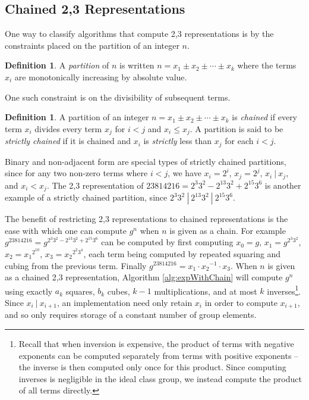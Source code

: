 \documentclass{ucalgthes1}
\theoremstyle{definition}
\newtheorem{defn}[thm]{Definition}
\begin{document}
\subsection{Chained 2,3 Representations}
\label{subsec:dbnsChains}


One way to classify algorithms that compute 2,3 representations is by the constraints placed on the partition of an integer $n$.

\begin{defn}
A \emph{partition} of $n$ is written $n = x_1 \pm x_2 \pm \cdots \pm x_k$ where the terms $x_i$ are monotonically increasing by absolute value.
\end{defn}

\noindent
One such constraint is on the divisibility of subsequent terms.

\begin{defn}
\label{defn:chained}
A partition of an integer $n = x_1 \pm x_2 \pm \cdots \pm x_k$ is \emph{chained} if every term $x_i$ divides every term $x_j$ for $i < j$ and $x_i \le x_j$. A partition is said to be \emph{strictly chained} if it is chained and $x_i$ is \emph{strictly} less than $x_j$ for each $i < j$.
\end{defn}

\noindent
Binary and non-adjacent form are special types of strictly chained partitions, since for any two non-zero terms where $i < j$, we have $x_i = 2^i$, $x_j = 2^j$, $ x_i ~|~ x_j$, and $x_i < x_j$.  The 2,3 representation of $23814216 = 2^3 3^2 - 2^{13} 3^2 + 2^{15} 3^6$ is another example of a strictly chained partition, since $2^3 3^2 ~|~ 2^{13} 3^2 ~|~ 2^{15} 3^6$.

The benefit of restricting 2,3 representations to chained representations is the ease with which one can compute $g^n$ when $n$ is given as a chain.  For example $g^{23814216} = g^{2^3 3^2 - 2^{13} 3^2 + 2^{15} 3^6}$ can be computed by first computing $x_0 = g$, $x_1 = g^{2^3 3^2}$, $x_2 = {x_1}^{2^{10}}$, $x_3 = {x_2}^{2^2 3^4}$, each term being computed by repeated squaring and cubing from the previous term.  Finally $g^{23814216} = x_1 \cdot {x_2}^{-1} \cdot x_3$.  When $n$ is given as a chained 2,3 representation, Algorithm \ref{alg:expWithChain} will compute $g^n$ using exactly $a_k$ squares, $b_k$  cubes, $k-1$ multiplications, and at most $k$ inverses\footnote{Recall that when inversion is expensive, the product of terms with negative exponents can be computed separately from terms with positive exponents -- the inverse is then computed only once for this product.  Since computing inverses is negligible in the ideal class group, we instead compute the product of all terms directly.}.  Since $x_i ~|~ x_{i+1}$, an implementation need only retain $x_i$ in order to compute $x_{i+1}$, and so only requires storage of a constant number of group elements.
\end{document}
